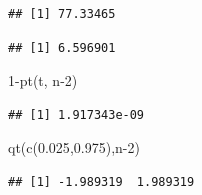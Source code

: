 \documentclass[
]{book}
\newenvironment{Shaded}{\begin{snugshade}}{\end{snugshade}}
\newcommand{\DecValTok}[1]{\textcolor[rgb]{0.00,0.00,0.81}{#1}}
\newcommand{\FloatTok}[1]{\textcolor[rgb]{0.00,0.00,0.81}{#1}}
\newcommand{\FunctionTok}[1]{\textcolor[rgb]{0.00,0.00,0.00}{#1}}
\newcommand{\NormalTok}[1]{#1}
\newcommand{\OtherTok}[1]{\textcolor[rgb]{0.56,0.35,0.01}{#1}}
\newcommand{\SpecialCharTok}[1]{\textcolor[rgb]{0.00,0.00,0.00}{#1}}
\begin{document}
\begin{verbatim}
## [1] 77.33465
\end{verbatim}

\begin{Shaded}
\end{Shaded}

\begin{verbatim}
## [1] 6.596901
\end{verbatim}

\begin{Shaded}
\begin{Highlighting}[]
\DecValTok{1}\SpecialCharTok{{-}}\FunctionTok{pt}\NormalTok{(t, n}\DecValTok{{-}2}\NormalTok{)}
\end{Highlighting}
\end{Shaded}

\begin{verbatim}
## [1] 1.917343e-09
\end{verbatim}

\begin{Shaded}
\begin{Highlighting}[]
\FunctionTok{qt}\NormalTok{(}\FunctionTok{c}\NormalTok{(}\FloatTok{0.025}\NormalTok{,}\FloatTok{0.975}\NormalTok{),n}\DecValTok{{-}2}\NormalTok{)}
\end{Highlighting}
\end{Shaded}

\begin{verbatim}
## [1] -1.989319  1.989319
\end{verbatim}
\end{document}
